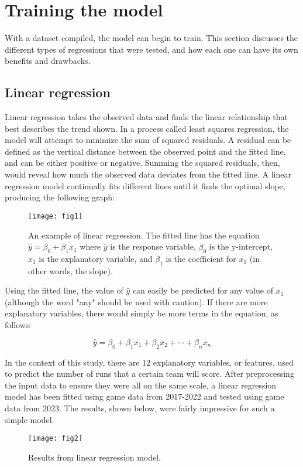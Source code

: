 \documentclass{paper}
\begin{document}
\section{Training the model}
With a dataset compiled, the model can begin to train. This section discusses the different types of regressions that were tested, and how each one can have its own benefits and drawbacks.

\subsection{Linear regression}
Linear regression takes the observed data and finds the linear relationship that best describes the trend shown. In a process called least squares regression, the model will attempt to minimize the sum of squared residuals. A residual can be defined as the vertical distance between the observed point and the fitted line, and can be either positive or negative. Summing the squared residuals, then, would reveal how much the observed data deviates from the fitted line. A linear regression model continually fits different lines until it finds the optimal slope, producing the following graph:

\begin{figure}[H]
  \centering
  \texttt{[image: fig1]}
  \caption{An example of linear regression. The fitted line has the equation $\hat{y}=\beta_0+\beta_1x_1$ where $\hat{y}$ is the response variable, $\beta_0$ is the y-intercept, $x_1$ is the explanatory variable, and $\beta_1$ is the coefficient for $x_1$ (in other words, the slope).}
\end{figure}

Using the fitted line, the value of $\hat{y}$ can easily be predicted for any value of $x_1$ (although the word "any" should be used with caution). If there are more explanatory variables, there would simply be more terms in the equation, as follows:

$$\hat{y}=\beta_0+\beta_1x_1+\beta_2x_2+\cdots+\beta_nx_n$$

In the context of this study, there are 12 explanatory variables, or features, used to predict the number of runs that a certain team will score. After preprocessing the input data to ensure they were all on the same scale, a linear regression model has been fitted using game data from 2017-2022 and tested using game data from 2023. The results, shown below, were fairly impressive for such a simple model.

\begin{figure}[H]
  \centering
  \texttt{[image: fig2]}
  \caption{Results from linear regression model.}
\end{figure}
\end{document}
